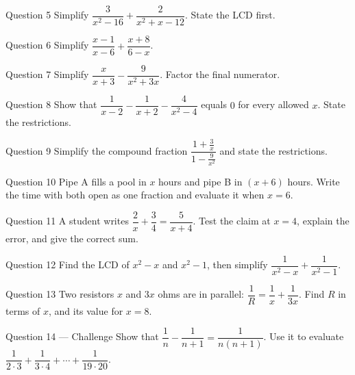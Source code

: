 \documentclass[11pt]{article}
\begin{document}
\begin{qbox}{Question 5}
Simplify $\dfrac{3}{x^2-16}+\dfrac{2}{x^2+x-12}$. State the LCD first.\workspace{3.8cm}
\end{qbox}

\begin{qbox}{Question 6}
Simplify $\dfrac{x-1}{x-6}+\dfrac{x+8}{6-x}$.\workspace{3cm}
\end{qbox}

\begin{qbox}{Question 7}
Simplify $\dfrac{x}{x+3}-\dfrac{9}{x^2+3x}$. Factor the final numerator.\workspace{3.4cm}
\end{qbox}

\begin{qbox}{Question 8}
Show that $\dfrac{1}{x-2}-\dfrac{1}{x+2}-\dfrac{4}{x^2-4}$ equals $0$ for every allowed $x$. State the restrictions.\workspace{3.8cm}
\end{qbox}

\begin{qbox}{Question 9}
Simplify the compound fraction $\dfrac{1+\frac3x}{1-\frac9{x^2}}$ and state the restrictions.\workspace{3.8cm}
\end{qbox}

\begin{qbox}{Question 10}
Pipe A fills a pool in $x$ hours and pipe B in $(x+6)$ hours. Write the time with both open as one fraction and evaluate it when $x=6$.\workspace{3.4cm}
\end{qbox}

\begin{qbox}{Question 11}
A student writes $\dfrac2x+\dfrac34=\dfrac{5}{x+4}$. Test the claim at $x=4$, explain the error, and give the correct sum.\workspace{3.2cm}
\end{qbox}

\begin{qbox}{Question 12}
Find the LCD of $x^2-x$ and $x^2-1$, then simplify $\dfrac{1}{x^2-x}+\dfrac{1}{x^2-1}$.\workspace{3.8cm}
\end{qbox}

\begin{qbox}{Question 13}
Two resistors $x$ and $3x$ ohms are in parallel: $\dfrac1R=\dfrac1x+\dfrac1{3x}$. Find $R$ in terms of $x$, and its value for $x=8$.\workspace{3cm}
\end{qbox}

\begin{qbox}{Question 14 --- Challenge}
Show that $\dfrac1n-\dfrac1{n+1}=\dfrac{1}{n(n+1)}$. Use it to evaluate $\dfrac1{2\cdot3}+\dfrac1{3\cdot4}+\cdots+\dfrac1{19\cdot20}$.\workspace{4.4cm}
\end{qbox}
\end{document}
